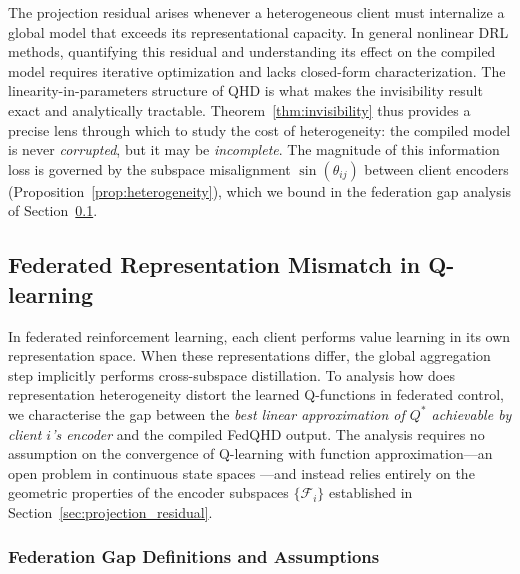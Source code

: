 \begin{remark}
The projection residual  arises
whenever a heterogeneous client must internalize a global model that
exceeds its representational capacity. In general nonlinear DRL methods, quantifying this residual and understanding
its effect on the compiled model requires iterative optimization and
lacks closed-form characterization. The linearity-in-parameters
structure of QHD is what makes the invisibility result exact and
analytically tractable. Theorem~\ref{thm:invisibility} thus provides
a precise lens through which to study the cost of heterogeneity: the
compiled model is never \emph{corrupted}, but it may be
\emph{incomplete}. The magnitude of this information loss is governed
by the subspace misalignment $\sin(\theta_{ij})$ between client
encoders (Proposition~\ref{prop:heterogeneity}), which we bound
in the federation gap analysis of
Section~\ref{subsec:fed_gap}.
\end{remark}



\subsection{Federated Representation Mismatch in Q-learning}
\label{subsec:fed_gap}

In federated reinforcement learning, each client performs value learning in its own representation space.
When these representations differ, the global aggregation step implicitly performs cross-subspace distillation. To analysis how does representation heterogeneity distort the learned Q-functions in federated control, we characterise the gap between the \emph{best linear approximation
of $Q^*$ achievable by client $i$'s encoder} and the compiled
FedQHD output.  The analysis requires no assumption on the
convergence of Q-learning with function approximation—an open
problem in continuous state spaces \citep{baird1995residual,
van_hasselt2018deep}—and instead relies entirely on the geometric
properties of the encoder subspaces $\{\mathcal{F}_i\}$
established in Section~\ref{sec:projection_residual}.


\subsubsection{Federation Gap Definitions and Assumptions}


